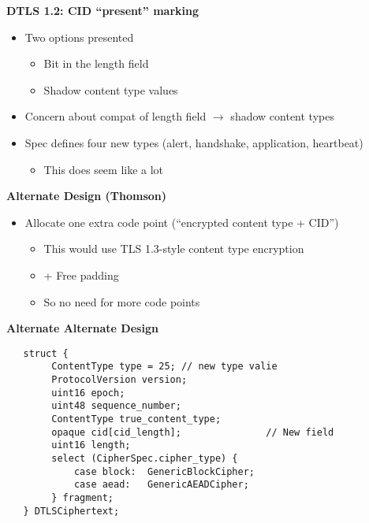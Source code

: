 \documentclass[helvetica]{seminar}
\newcommand{\heading}[1]{%
  \begin{center} 
    \large\bf 
    #1 
  \end{center} 
  \vspace{.4 in}}
\begin{document}
\begin{slide}
  \heading{DTLS 1.2: CID ``present'' marking}

  \begin{itemize}
  \item Two options presented
    \begin{itemize}
    \item Bit in the length field
    \item Shadow content type values
    \end{itemize}

  \item Concern about compat of length field $\rightarrow$ shadow content types
  \item Spec defines four new types (alert, handshake, application, heartbeat)
    \begin{itemize}
    \item This does seem like a lot
    \end{itemize}
  \end{itemize}
\end{slide}

\begin{slide}
  \heading{Alternate Design (Thomson)}

  \begin{itemize}
  \item Allocate one extra code point (``encrypted content type + CID'')
    \begin{itemize}
    \item This would use TLS 1.3-style content type encryption
    \item + Free padding
    \item So no need for more code points
    \end{itemize}    
  \end{itemize}
\end{slide}

\begin{slide}
  \heading{Alternate Alternate Design}

\begin{verbatim}
   struct {
        ContentType type = 25; // new type valie
        ProtocolVersion version;
        uint16 epoch;
        uint48 sequence_number;
        ContentType true_content_type;
        opaque cid[cid_length];               // New field
        uint16 length;
        select (CipherSpec.cipher_type) {
            case block:  GenericBlockCipher;
            case aead:   GenericAEADCipher;
        } fragment;
   } DTLSCiphertext;
\end{verbatim}  
\end{slide}
\end{document}
